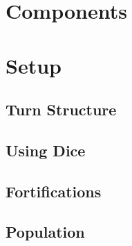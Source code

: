 \documentclass[12pt,a4paper,twocolumn,titlepage]{article}
\begin{document}
\begin{titlepage}
  
\end{titlepage}



\section{Components}
\label{sec:components}


\section{Setup}
\label{sec:setup}

% 

\subsection{Turn Structure}
\label{sec:turns}


\subsection{Using Dice}
\label{sec:dice}

% 

\subsection{Fortifications}
\label{sec:fortifications}

% 

% 

\subsection{Population}
\label{sec:population}

% 
\end{document}
